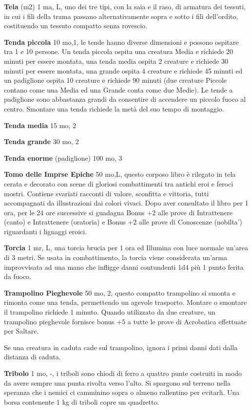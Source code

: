 \documentclass[a4paper,11pt,twoside,openany]{book}
\begin{document}
\textbf{Tela} (m2) 1 ma, L, uno dei tre tipi, con la saia e il raso, di armatura dei tessuti, in cui i fili della trama passano alternativamente sopra e sotto i fili dell'ordito, costituendo un tessuto compatto senza rovescio.

\textbf{Tenda piccola} 10 mo,1, le tende hanno diverse dimensioni e possono ospitare tra 1 e 10 persone. Un tenda piccola ospita una creatura Media e richiede 20 minuti per essere montata, una tenda media ospita 2 creature e richiede 30 minuti per essere montata, una grande ospita 4 creature e richiede 45 minuti ed un padiglione ospita 10 creature e richiede 90 minuti (due creature Piccole contano come una Media ed una Grande conta come due Medie). Le tende a padiglione sono abbastanza grandi da consentire di accendere un piccolo fuoco al centro. Smontare una tenda richiede la metà del suo tempo di montaggio.

\textbf{Tenda media} 15 mo, 2

\textbf{Tenda grande} 30 mo, 2

\textbf{Tenda enorme} (padiglione) 100 mo, 3

\textbf{Tomo delle Imprse Epiche} 50 mo,L, questo corposo libro è rilegato in tela cerata e decorato con scene di gloriosi combattimenti tra antichi eroi e feroci mostri.
Contiene svariati racconti di valore, sconfitta e vittoria, tutti accompagnati da illustrazioni dai colori vivaci.
Dopo aver consultato il libro per 1 ora, per le 24 ore successive si guadagna Bonus +2 alle prove di Intrattenere (canto) e Intrattenere (oratoria) e Bonus +2 alle prove di Conoscenze (nobilta') riguardanti i lignaggi eroici.

\textbf{Torcia} 1 mr, L, una torcia brucia per 1 ora ed Illumina con luce normale un'area di 3 metri. Se usata in combattimento, la torcia viene considerata un'arma improvvisata ad una mano che infligge danni contundenti 1d4 più 1 punto ferita da fuoco.

\textbf{Trampolino Pieghevole} 50 mo, 2, questo compatto trampolino si smonta e rimonta come una tenda, permettendo un agevole trasporto. Montare o smontare il trampolino richiede 1 minuto. Quando utilizzato da due creature, un trampolino pieghevole fornisce bonus +5 a tutte le prove di Acrobatica effettuate per Saltare.

Se una creatura in caduta cade sul trampolino, ignora i primi danni dati dalla distanza di caduta.

\textbf{Tribolo} 1 mo, -, i triboli sono chiodi di ferro a quattro punte costruiti in modo da avere sempre una punta rivolta verso l'alto. Si spargono sul terreno nella speranza che i nemici ci camminino sopra o almeno rallentino per evitarli. Una borsa contenente 1 kg di triboli copre un quadretto.
\end{document}
